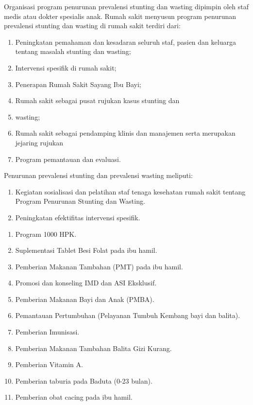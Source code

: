 \documentclass[
]{book}
\providecommand{\tightlist}{%
  \setlength{\itemsep}{0pt}\setlength{\parskip}{0pt}}
\begin{document}
Organisasi program penurunan prevalensi stunting dan wasting dipimpin oleh staf medis atau dokter spesialis anak. Rumah sakit menyusun program penurunan prevalensi stunting dan wasting di rumah sakit terdiri dari:

\begin{enumerate}
\def\labelenumi{\arabic{enumi}.}
\tightlist
\item
  Peningkatan pemahaman dan kesadaran seluruh staf, pasien dan keluarga tentang masalah stunting dan wasting;
\item
  Intervensi spesifik di rumah sakit;
\item
  Penerapan Rumah Sakit Sayang Ibu Bayi;
\item
  Rumah sakit sebagai pusat rujukan kasus stunting dan
\item
  wasting;
\item
  Rumah sakit sebagai pendamping klinis dan manajemen serta merupakan jejaring rujukan
\item
  Program pemantauan dan evaluasi.
\end{enumerate}

Penurunan prevalensi stunting dan prevalensi wasting
meliputi:

\begin{enumerate}
\def\labelenumi{\arabic{enumi}.}
\tightlist
\item
  Kegiatan sosialisasi dan pelatihan staf tenaga kesehatan rumah sakit tentang Program Penurunan Stunting dan Wasting.
\item
  Peningkatan efektifitas intervensi spesifik.
\end{enumerate}

\begin{enumerate}
\def\labelenumi{\alph{enumi}.}
\tightlist
\item
  Program 1000 HPK.
\item
  Suplementasi Tablet Besi Folat pada ibu hamil.
\item
  Pemberian Makanan Tambahan (PMT) pada ibu hamil.
\item
  Promosi dan konseling IMD dan ASI Eksklusif.
\item
  Pemberian Makanan Bayi dan Anak (PMBA).
\item
  Pemantauan Pertumbuhan (Pelayanan Tumbuh Kembang bayi dan balita).
\item
  Pemberian Imunisasi.
\item
  Pemberian Makanan Tambahan Balita Gizi Kurang.
\item
  Pemberian Vitamin A.
\item
  Pemberian taburia pada Baduta (0-23 bulan).
\item
  Pemberian obat cacing pada ibu hamil.
\end{enumerate}
\end{document}
